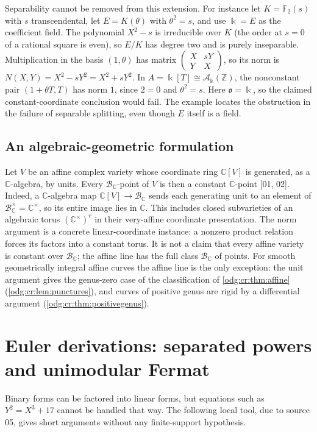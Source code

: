 \documentclass[11pt,oneside]{article}
\numberwithin{equation}{section}
\theoremstyle{definition}
\theoremstyle{remark}
\newcommand{\Z}{\mathbb Z}
\newcommand{\C}{\mathbb C}
\newcommand{\BC}{\mathcal B_{\C}}
\newcommand{\src}[1]{\textup{\textsf{\small[#1]}}}
\begin{document}
Separability cannot be removed from this extension. For instance let
$K=\mathbb F_2(s)$ with $s$ transcendental, let
$E=K(\theta)$ with $\theta^2=s$, and use $\Bbbk=E$ as the coefficient
field. The polynomial $X^2-s$ is irreducible over $K$ (the order at
$s=0$ of a rational square is even), so $E/K$ has degree two and is
purely inseparable. Multiplication in the basis $(1,\theta)$ has matrix
$\left(\begin{smallmatrix}X&sY\\Y&X\end{smallmatrix}\right)$, so its norm is
$N(X,Y)=X^2-sY^2=X^2+sY^2$. In
$A=\Bbbk[T]\cong\mathcal A_\Bbbk(\Z)$, the nonconstant pair
$(1+\theta T,T)$ has norm $1$, since $2=0$ and $\theta^2=s$.
Here $\mathfrak o=\Bbbk$, so the claimed constant-coordinate conclusion
would fail. The example locates the obstruction in the failure of
separable splitting, even though $E$ itself is a field.

\subsection{An algebraic-geometric formulation}

Let $V$ be an affine complex variety whose coordinate ring $\C[V]$ is
generated, as a $\C$-algebra, by units. Every $\BC$-point of $V$ is
then a constant $\C$-point \src{01, 02}. Indeed, a $\C$-algebra map
$\C[V]\to\BC$ sends each generating unit to an element of
$\BC^\times=\C^\times$, so its entire image lies in $\C$. This includes
closed subvarieties of an algebraic torus $(\C^\times)^r$ in their
very-affine coordinate presentation. The norm argument is a concrete
linear-coordinate instance: a nonzero product relation forces its factors
into a constant torus. It is not a claim that every affine variety is
constant over $\BC$; the affine line has the full class $\BC$ of points.
For smooth geometrically integral affine curves the affine line is the only
exception: the unit argument gives the genus-zero case of the classification
of \cref{odg:cr:thm:affine}
(\cref{odg:cr:lem:punctures}), and curves of positive genus are rigid by a
differential argument (\cref{odg:cr:thm:positivegenus}).

\section{Euler derivations: separated powers and unimodular Fermat}\label{odg:sec:derivations}

Binary forms can be factored into linear forms, but equations such as
$Y^2=X^3+17$ cannot be handled that way. The following local tool, due to
source 05, gives short arguments without any finite-support hypothesis.
\end{document}
